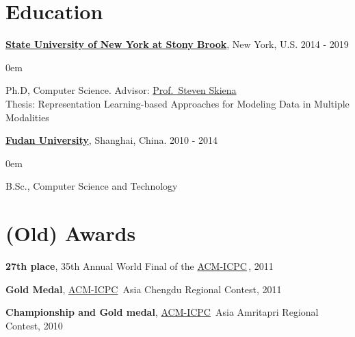 \documentclass[line,margin]{cv}
\newenvironment{block}
{
  \begin{addmargin}[2em]{0em}%
}
{
  \end{addmargin}
}
\newcommand{\myemph}{\textbf}
\newcommand{\SUNY}{\href{http://www.stonybrook.edu/}{State University of New York at Stony Brook}}
\newcommand{\Fudan}{\href{http://www.fudan.edu.cn/englishnew/}{Fudan University}}
\newcommand{\Skiena}{\href{https://www3.cs.stonybrook.edu/~skiena/}{Prof.\ Steven Skiena}}
\newcommand{\ICPC}{\href{http://https://icpc.global//}{ACM-ICPC}}
\begin{document}
\begin{resume}
\section{Education}

  {\bf \SUNY}, New York, U.S. \hfill 2014 - 2019
  \begin{block}
    Ph.D, Computer Science. Advisor: \Skiena{} \\
    Thesis: Representation Learning-based Approaches for Modeling Data in Multiple Modalities
  \end{block}

  {\bf \Fudan}, Shanghai, China. \hfill 2010 - 2014

  \begin{block}
    B.Sc., Computer Science and Technology 
  \end{block}


\section{(Old) Awards}
  \myemph{27th place}, 35th Annual World Final of the \ICPC \,, 2011

  \myemph{Gold Medal}, \ICPC\ Asia Chengdu Regional Contest, 2011

  \myemph{Championship and Gold medal}, \ICPC\ Asia Amritapri Regional Contest, 2010

\end{resume}
\end{document}

